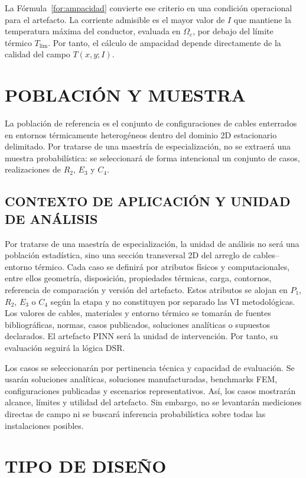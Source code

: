 La Fórmula~\ref{for:ampacidad} convierte ese criterio en una condición operacional para el artefacto. La corriente admisible es el mayor valor de $I$ que mantiene la temperatura máxima del conductor, evaluada en $\Omega_c$, por debajo del límite térmico $T_{\mathrm{lim}}$. Por tanto, el cálculo de ampacidad depende directamente de la calidad del campo $T(x,y;I)$.

\section{POBLACIÓN Y MUESTRA}

La población de referencia es el conjunto de configuraciones de cables enterrados en entornos térmicamente heterogéneos dentro del dominio 2D estacionario delimitado. Por tratarse de una maestría de especialización, no se extraerá una muestra probabilística: se seleccionará de forma intencional un conjunto de casos, realizaciones de $R_2$, $E_3$ y $C_4$.

\subsection{CONTEXTO DE APLICACIÓN Y UNIDAD DE ANÁLISIS}
\label{subsec:unidad-analisis}

Por tratarse de una maestría de especialización, la unidad de análisis no será una población estadística, sino una sección transversal 2D del arreglo de cables--entorno térmico. Cada caso se definirá por atributos físicos y computacionales, entre ellos geometría, disposición, propiedades térmicas, carga, contornos, referencia de comparación y versión del artefacto. Estos atributos se alojan en $P_1$, $R_2$, $E_3$ o $C_4$ según la etapa y no constituyen por separado las VI metodológicas. Los valores de cables, materiales y entorno térmico se tomarán de fuentes bibliográficas, normas, casos publicados, soluciones analíticas o supuestos declarados. El artefacto PINN será la unidad de intervención. Por tanto, su evaluación seguirá la lógica DSR.

Los casos se seleccionarán por pertinencia técnica y capacidad de evaluación. Se usarán soluciones analíticas, soluciones manufacturadas, benchmarks FEM, configuraciones publicadas y escenarios representativos. Así, los casos mostrarán alcance, límites y utilidad del artefacto. Sin embargo, no se levantarán mediciones directas de campo ni se buscará inferencia probabilística sobre todas las instalaciones posibles.

\section{TIPO DE DISEÑO}

